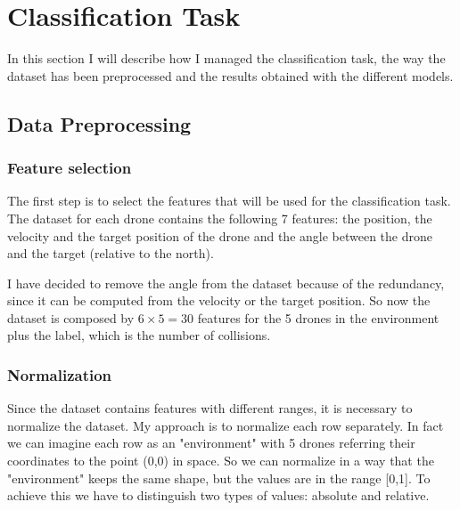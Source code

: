 \section{Classification Task} \label{sec:classification}
In this section I will describe how I managed the classification task, the way the dataset has been preprocessed and the results obtained with the different models.

\subsection{Data Preprocessing} \label{sec:preprocessing}

\subsubsection{Feature selection} \label{sec:preprocessing-feature-selection}
The first step is to select the features that will be used for the classification task.
The dataset for each drone contains the following 7 features: the position, the velocity and the target position of the drone and the angle between the drone and the target (relative to the north).

I have decided to remove the angle from the dataset because of the redundancy, since it can be computed from the velocity or the target position.
So now the dataset is composed by $6 \times 5 = 30$ features for the 5 drones in the environment plus the label, which is the number of collisions.

\subsubsection{Normalization} \label{sec:preprocessing-normalization}
Since the dataset contains features with different ranges, it is necessary to normalize the dataset.
My approach is to normalize each row separately. In fact we can imagine each row as an "environment" with 5 drones referring their coordinates to the point (0,0) in space.
So we can normalize in a way that the "environment" keeps the same shape, but the values are in the range [0,1].
To achieve this we have to distinguish two types of values: absolute and relative.

